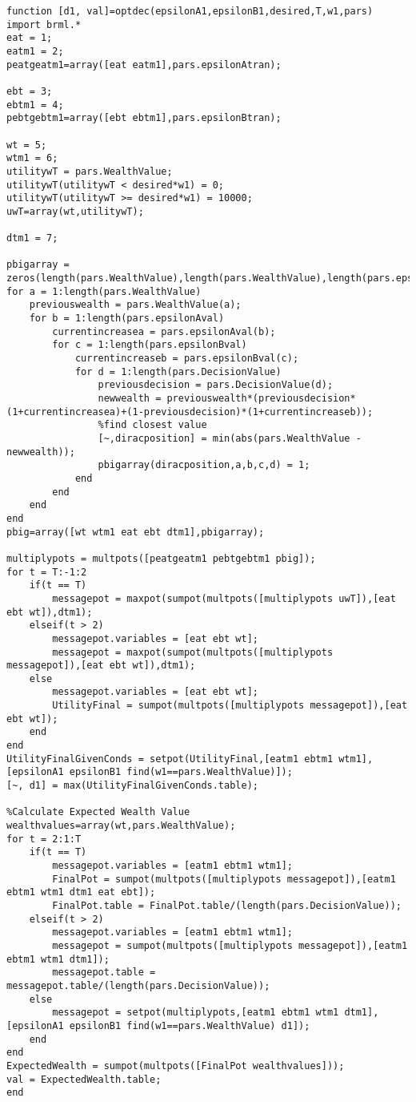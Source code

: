 \documentclass[11pt,a4paper,oneside]{report}
\begin{document}
\begin{lstlisting}
function [d1, val]=optdec(epsilonA1,epsilonB1,desired,T,w1,pars)
import brml.*
eat = 1;
eatm1 = 2;
peatgeatm1=array([eat eatm1],pars.epsilonAtran);

ebt = 3;
ebtm1 = 4;
pebtgebtm1=array([ebt ebtm1],pars.epsilonBtran);

wt = 5;
wtm1 = 6;
utilitywT = pars.WealthValue;
utilitywT(utilitywT < desired*w1) = 0;
utilitywT(utilitywT >= desired*w1) = 10000;
uwT=array(wt,utilitywT);

dtm1 = 7;

pbigarray = zeros(length(pars.WealthValue),length(pars.WealthValue),length(pars.epsilonAval),length(pars.epsilonBval),length(pars.DecisionValue));
for a = 1:length(pars.WealthValue)
    previouswealth = pars.WealthValue(a);
    for b = 1:length(pars.epsilonAval)
        currentincreasea = pars.epsilonAval(b);
        for c = 1:length(pars.epsilonBval)
            currentincreaseb = pars.epsilonBval(c);
            for d = 1:length(pars.DecisionValue)
                previousdecision = pars.DecisionValue(d);
                newwealth = previouswealth*(previousdecision*(1+currentincreasea)+(1-previousdecision)*(1+currentincreaseb));
                %find closest value
                [~,diracposition] = min(abs(pars.WealthValue - newwealth));
                pbigarray(diracposition,a,b,c,d) = 1;
            end
        end
    end
end
pbig=array([wt wtm1 eat ebt dtm1],pbigarray);

multiplypots = multpots([peatgeatm1 pebtgebtm1 pbig]);
for t = T:-1:2
    if(t == T)
        messagepot = maxpot(sumpot(multpots([multiplypots uwT]),[eat ebt wt]),dtm1);
    elseif(t > 2)
        messagepot.variables = [eat ebt wt];
        messagepot = maxpot(sumpot(multpots([multiplypots messagepot]),[eat ebt wt]),dtm1);
    else
        messagepot.variables = [eat ebt wt];
        UtilityFinal = sumpot(multpots([multiplypots messagepot]),[eat ebt wt]);
    end
end
UtilityFinalGivenConds = setpot(UtilityFinal,[eatm1 ebtm1 wtm1],[epsilonA1 epsilonB1 find(w1==pars.WealthValue)]);
[~, d1] = max(UtilityFinalGivenConds.table);

%Calculate Expected Wealth Value
wealthvalues=array(wt,pars.WealthValue);
for t = 2:1:T
    if(t == T)
        messagepot.variables = [eatm1 ebtm1 wtm1];
        FinalPot = sumpot(multpots([multiplypots messagepot]),[eatm1 ebtm1 wtm1 dtm1 eat ebt]);        
        FinalPot.table = FinalPot.table/(length(pars.DecisionValue));
    elseif(t > 2)
        messagepot.variables = [eatm1 ebtm1 wtm1];
        messagepot = sumpot(multpots([multiplypots messagepot]),[eatm1 ebtm1 wtm1 dtm1]);
        messagepot.table = messagepot.table/(length(pars.DecisionValue));
    else
        messagepot = setpot(multiplypots,[eatm1 ebtm1 wtm1 dtm1],[epsilonA1 epsilonB1 find(w1==pars.WealthValue) d1]);
    end
end
ExpectedWealth = sumpot(multpots([FinalPot wealthvalues]));
val = ExpectedWealth.table;
end
\end{lstlisting}
\end{document}
